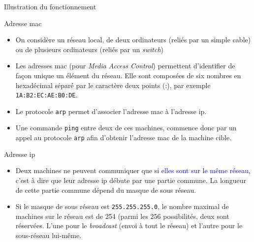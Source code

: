 \documentclass[10pt]{beamer}
\begin{document}
\begin{frame}
\begin{block}{Illustration du fonctionnement}
     
   
   
   
	\end{block}
\end{frame}


\begin{frame}
	\mframe{\Reseau}
	\begin{alertblock}{Adresse mac}
		\begin{itemize}
			\item<1-> On considère un réseau local, de deux ordinateurs (reliés par un simple cable) ou de plusieurs ordinateurs (reliés par un \textit{switch})
			\item<2-> Les adresses {\sc mac} (pour \textit{Media Access Control})  permettent d'identifier de façon unique un élément du réseau. Elle sont composées de six nombres en hexadécimal séparé par le caractère deux points (\textcolor{blue}{:}), par exemple {\tt 1A:B2:EC:AE:B0:DE}.
			\item<3-> Le protocole {\tt arp} permet d'associer l'adresse {\sc mac} à l'adresse {\sc ip}.
			\item<4-> Une commande {\tt ping} entre deux de ces machines, commence donc par un appel au protocole {\tt arp} afin d'obtenir l'adresse {\sc mac} de la machine cible.
		\end{itemize}
	\end{alertblock}
\end{frame}


\begin{frame}
	\mframe{\Reseau}
	\begin{alertblock}{Adresse ip}
		\begin{itemize}
			\item<1-> Deux machines ne peuvent communiquer que si \textcolor{blue}{elles sont sur le même réseau}, c'est à dire que leur adresse {\sc ip} débute par une partie commune. La longueur de cette partie commune dépend du masque de sous réseau.
			\item<2-> Si le masque de sous réseau est {\tt 255.255.255.0}, le nombre maximal de machines sur le réseau est de 254 (parmi les 256 possibilités, deux sont réservées. L'une pour le \textit{broadcast} (envoi à tout le réseau) et l'autre pour le sous-réseau lui-même.
		\end{itemize}
	\end{alertblock}
\end{frame}
\end{document}
